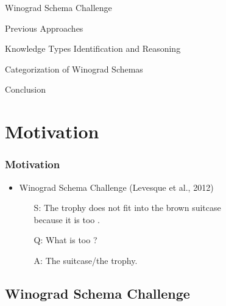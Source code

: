 \documentclass[c,8pt,xcolor...,x11names]{beamer}
\begin{document}
 
\begin{frame}
\customtitle
\begin{list2}
\item Winograd Schema Challenge
\item Previous Approaches
\item Knowledge Types Identification and Reasoning
\item Categorization of Winograd Schemas
\item Conclusion
\end{list2}
\end{frame}


\section{Motivation} 


\begin{frame}
  \frametitle{Motivation}
	\begin{itemize} 	
	\item Winograd Schema Challenge (Levesque et al., 2012)
	\begin{itemize}
		\normalsize
		\item[S:] The trophy does not fit into the brown suitcase\\ because \alert{it} is too .%
		\item[Q:] What is too  \only<2,3>{large}?
		\item[A:] The suitcase/the trophy.
	\end{itemize}	
	
\end{itemize}
		\centering

\end{frame}

\begin{comment}
	content...

\begin{frame}
\vfill
\begin{LARGE}
\hfill Structure of a {\sc Beamer} Document \hfill 
\end{LARGE}
\vfill
\end{frame}
\end{comment}

\subsection{Winograd Schema Challenge}
\end{document}
